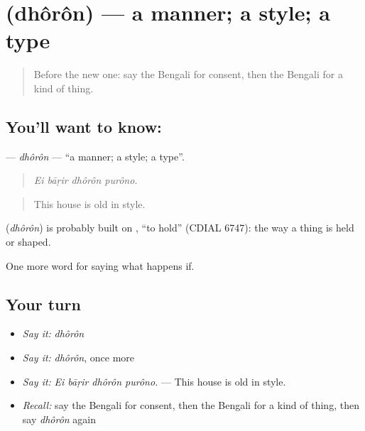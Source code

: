 \section[\texorpdfstring{\bn{ধরন} (dhôrôn)}{ধরন (dhôrôn)}]{ (dhôrôn) — a manner; a style; a type}

\label{lesson:BN-C536-dhoron}



\begin{quote}
Before the new one: say the Bengali for consent, then the Bengali for a kind of thing.
\end{quote}

\subsection*{You'll want to know: }
\textbf{} — \emph{dhôrôn} — \textquotedblleft{}a manner; a style; a type\textquotedblright{}.

\begin{quote}
   
\end{quote}

\begin{quote}
\emph{Ei bāṛir dhôrôn purôno.}
\end{quote}

\begin{quote}
This house is old in style.
\end{quote}

\begin{cousinweb}
\textbf{} (\emph{dhôrôn}) is probably built on , \textquotedblleft{}to hold\textquotedblright{} (CDIAL 6747): the way a thing is held or shaped.
\end{cousinweb}

\begin{grammarlens}[title={What you've built}]
One more word for saying what happens if.
\end{grammarlens}

\subsection*{Your turn}
\begin{itemize}
\raggedright
  \item \emph{Say it:} \emph{dhôrôn}
  \item \emph{Say it:} \emph{dhôrôn}, once more
  \item \emph{Say it:} \emph{Ei bāṛir dhôrôn purôno.} — This house is old in style.
  \item \emph{Recall:} say the Bengali for consent, then the Bengali for a kind of thing, then say \emph{dhôrôn} again
\end{itemize}

